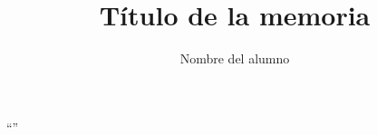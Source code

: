 \documentclass[letterpaper]{article}
\title{Título de la memoria}
\author{Nombre del alumno}
\begin{document}
\begin{centering}
    ``\fontsize{20}{24}\selectfont \MakeUppercase{\@title}''
\end{centering}


{}
\end{document}
